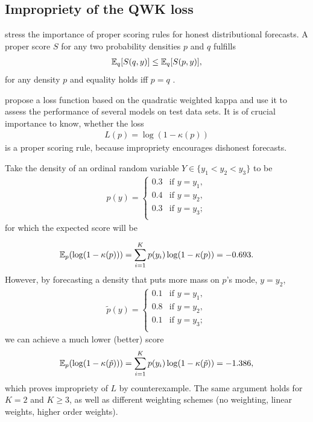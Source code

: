 \documentclass[article,nojss,shortnames]{jss}\usepackage[]{graphicx}\usepackage[]{color}
\begin{document}
\begin{appendix}
\section{Impropriety of the QWK loss} \label{app:improper}

\citet{brocker2007scoring} stress the importance of proper scoring rules for
honest distributional forecasts.
A proper score $S$ for any two probability densities $p$ and $q$ fulfills
\begin{align*}
  \mathbb{E}_q[S(q, y)] \leq \mathbb{E}_q[S(p, y)],
\end{align*}
for any density $p$ and equality holds iff $p = q$ \citep{gneiting2007strictly}.

\citet{de2018weighted} propose a loss function based on the quadratic weighted
kappa \citep{cohen1968weighted} and use it to assess the performance of several
models on test data sets. It is of crucial importance to know, whether the loss
\begin{align*}
  L(p) = \log(1 - \kappa(p))
\end{align*}
is a proper scoring rule, because impropriety encourages dishonest forecasts.

Take the density of an ordinal random variable $Y \in \{y_1 < y_2 < y_3\}$ to be
\begin{align*}
  p(y) =
    \begin{cases}
      0.3 & \mbox{if } y = y_1, \\
      0.4 & \mbox{if } y = y_2, \\
      0.3 & \mbox{if } y = y_3; \\
    \end{cases}
\end{align*}
for which the expected score will be

\begin{align*}
  \mathbb{E}_p(\log(1 - \kappa(p))) = \sum_{i = 1}^K p(y_i) \log(1 - \kappa(p))
  = -0.693.
\end{align*}
However, by forecasting a density that puts more mass on $p$'s mode, $y = y_2$,
\begin{align*}
  \tilde{p}(y) =
    \begin{cases}
      0.1 & \mbox{if } y = y_1, \\
      0.8 & \mbox{if } y = y_2, \\
      0.1 & \mbox{if } y = y_3; \\
    \end{cases}
\end{align*}
we can achieve a much lower (better) score
\begin{align*}
  \mathbb{E}_{p}(\log(1 - \kappa(\tilde{p}))) = \sum_{i = 1}^K
    p(y_i) \log(1 - \kappa(\tilde{p}))
  = -1.386,
\end{align*}
which proves impropriety of $L$ by counterexample.
The same argument holds for $K = 2$ and $K \geq 3$, as well as different weighting
schemes (no weighting, linear weights, higher order weights).


\end{appendix}
\end{document}
